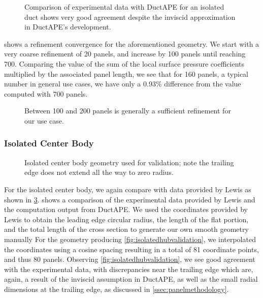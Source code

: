 \begin{figure}[h!]
    \centering
        \caption{Comparison of experimental data with DuctAPE for an isolated duct shows very good agreement despite the inviscid approximation in DuctAPE's development.}
    \label{fig:isolatedductvalidation}
\end{figure}

 shows a refinement convergence for the aforementioned geometry.
%
We start with a very coarse refinement of 20 panels, and increase by 100 panels until reaching 700.
%
Comparing the value of the sum of the local surface pressure coefficients multiplied by the associated panel length, we see that for 160 panels, a typical number in general use cases, we have only a 0.93\% difference from the value computed with 700 panels.

\begin{figure}[h!]
    \centering
        \caption{Between 100 and 200 panels is generally a sufficient refinement for our use case.}
    \label{fig:isolatedductgridconv}
\end{figure}


\subsubsection{Isolated Center Body}

\begin{figure}[hb!]
    \centering
        
        \caption{Isolated center body geometry used for validation; note the trailing edge does not extend all the way to zero radius.}
    \label{fig:cbgeom}
\end{figure}

For the isolated center body, we again compare with data provided by Lewis as shown in \cref{fig:cbgeom}.
%
 shows a comparison of the experimental data provided by Lewis and the computation output from DuctAPE.
%
We used the coordinates provided by Lewis to obtain the leading edge circular radius, the length of the flat portion, and the total length of the cross section to generate our own smooth geometry manually
%
For the geometry producing \cref{fig:isolatedhubvalidation}, we interpolated the coordinates using a cosine spacing resulting in a total of 81 coordinate points, and thus 80 panels.
%
Observing \cref{fig:isolatedhubvalidation}, we see good agreement with the experimental data, with discrepancies near the trailing edge which are, again, a result of the inviscid assumption in DuctAPE, as well as the small radial dimensions at the trailing edge, as discussed in \cref{ssec:panelmethodology}.

